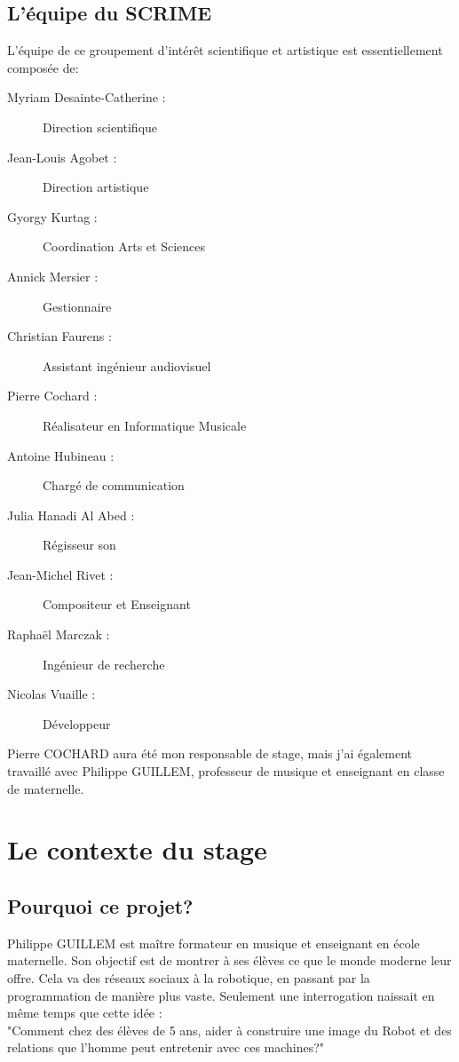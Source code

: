 \documentclass[a4paper, 12pt]{report}
\begin{document}
\subsection{L'équipe du SCRIME \pageref{SCRIME}}
L'équipe de ce groupement d'intérêt scientifique et artistique est essentiellement composée de:
\begin{description}
\item[Myriam Desainte-Catherine :] Direction scientifique
\item[Jean-Louis Agobet :] Direction artistique
\item[Gyorgy Kurtag :] Coordination Arts et Sciences
\item[Annick Mersier :] Gestionnaire
\item[Christian Faurens :] Assistant ingénieur audiovisuel
\item[Pierre Cochard :] Réalisateur en Informatique Musicale
\item[Antoine Hubineau :] Chargé de communication
\item[Julia Hanadi Al Abed :] Régisseur son
\item[Jean-Michel Rivet :] Compositeur et Enseignant
\item[Raphaël Marczak :] Ingénieur de recherche
\item[Nicolas Vuaille :] Développeur
\end{description}
Pierre COCHARD  aura été mon responsable de stage, mais j'ai également travaillé avec Philippe GUILLEM, professeur de musique et enseignant en classe de maternelle.

\section{Le contexte du stage}
\subsection{Pourquoi ce projet?}

Philippe GUILLEM est maître formateur en musique et enseignant en école maternelle. Son objectif est de montrer à ses élèves ce que le monde moderne leur offre. Cela va des réseaux sociaux à la robotique, en passant par la programmation de manière plus vaste. Seulement une interrogation naissait en même temps que cette idée :\\

"Comment chez des élèves de 5 ans, aider à construire une image du Robot et des relations que l'homme peut entretenir avec ces machines?" \cite{FragClasseThymio}\\
\end{document}

